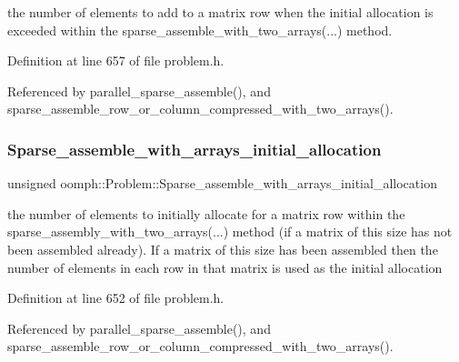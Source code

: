 the number of elements to add to a matrix row when the initial allocation is exceeded within the sparse\+\_\+assemble\+\_\+with\+\_\+two\+\_\+arrays(...) method. 



Definition at line 657 of file problem.\+h.



Referenced by parallel\+\_\+sparse\+\_\+assemble(), and sparse\+\_\+assemble\+\_\+row\+\_\+or\+\_\+column\+\_\+compressed\+\_\+with\+\_\+two\+\_\+arrays().

\mbox{\label{classoomph_1_1Problem_ad2d5f8e18619fafcff11727b1c55b3eb}} 
\subsubsection{\texorpdfstring{Sparse\+\_\+assemble\+\_\+with\+\_\+arrays\+\_\+initial\+\_\+allocation}{Sparse\_assemble\_with\_arrays\_initial\_allocation}}
{\footnotesize\ttfamily unsigned oomph\+::\+Problem\+::\+Sparse\+\_\+assemble\+\_\+with\+\_\+arrays\+\_\+initial\+\_\+allocation\hspace{0.3cm}{\ttfamily [protected]}}



the number of elements to initially allocate for a matrix row within the sparse\+\_\+assembly\+\_\+with\+\_\+two\+\_\+arrays(...) method (if a matrix of this size has not been assembled already). If a matrix of this size has been assembled then the number of elements in each row in that matrix is used as the initial allocation 



Definition at line 652 of file problem.\+h.



Referenced by parallel\+\_\+sparse\+\_\+assemble(), and sparse\+\_\+assemble\+\_\+row\+\_\+or\+\_\+column\+\_\+compressed\+\_\+with\+\_\+two\+\_\+arrays().

\mbox{\label{classoomph_1_1Problem_a547c85bfa6a2eb3effc4db1b46ebcdde}} 

